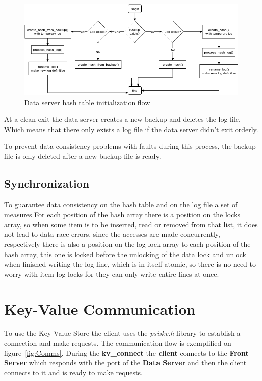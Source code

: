 \documentclass[12pt]{article} %
\begin{document}
\begin{figure}[H]
\centering
\includegraphics[width=\textwidth]{./Pictures/BackupLogFlow.png}
\caption{Data server hash table initialization flow}\label{fig:BackupLogFlow}
\end{figure}

At a clean exit the data server creates a new backup and deletes the log file. 
Which means that there only exists a log file if the data server didn't exit orderly.

To prevent data consistency problems with faults during this process, the 
backup file is only deleted after a new backup file is ready.

\subsection{Synchronization}
\label{sub:Synchronization}

To guarantee data consistency on the hash table and on the log file a set of measures
For each position of the hash array there is a position on the locks array, 
so when some item is to be inserted, read or removed from that list, it does not 
lead to data race errors, since the accesses are made concurrently, respectively 
there is also a position on the log lock array to each position of the hash array,
this one is locked before the unlocking of the data lock and unlock when finished 
writing the log line, which is in itself atomic, so there is no need to worry with
item log locks for they can only write entire lines at once.

\section{Key-Value Communication}

To use the Key-Value Store the client uses the \emph{psiskv.h} library to establish a 
connection and make requests. The communication flow is exemplified on figure~\ref{fig:Comms}. 
During the \textbf{kv\_connect} the \textbf{client} connects to the \textbf{Front Server} which responds 
with the port of the \textbf{Data Server} and then the client connects to it and is ready 
to make requests.
\end{document}
